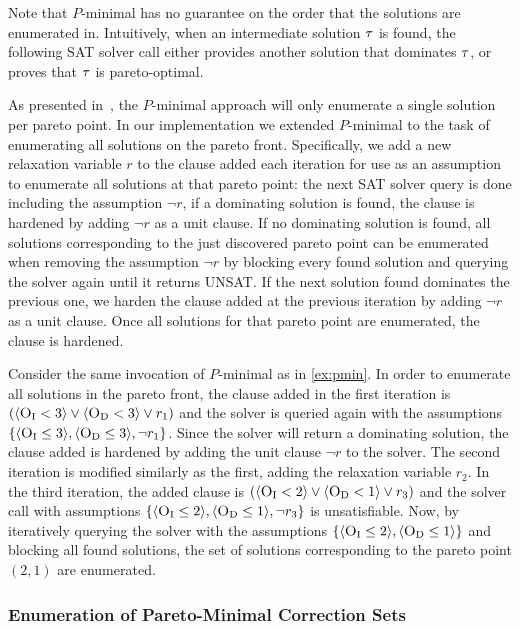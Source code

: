 Note that $P$-minimal has no guarantee on the order that the solutions are enumerated in. 
Intuitively, when an intermediate solution $\tau$ is found, the following SAT solver call either provides another solution that dominates $\tau$, or proves that $\tau$ is pareto-optimal.  

As presented in~\cite{DBLP:conf/cp/SohBTB17}, the $P$-minimal approach will only enumerate a single solution per pareto point.
In our implementation we extended $P$-minimal to the task of enumerating all solutions on the pareto front.
Specifically, we add a new relaxation variable $r$ to the clause added each iteration for use as an assumption to enumerate all solutions at that pareto point:
the next SAT solver query is done including the assumption $\lnot r$, if a dominating solution is found, the clause is hardened by adding $\lnot r$ as a unit clause.
If no dominating solution is found, all solutions corresponding to the just discovered pareto point can be enumerated when removing the assumption $\lnot r$ by blocking every found solution and querying the solver again until it returns UNSAT.
If the next solution found dominates the previous one, we harden the clause added at the previous iteration by adding $\lnot r$ as a unit clause.
Once all solutions for that pareto point are enumerated, the clause is hardened.

\begin{example}
  Consider the same invocation of $P$-minimal as in \cref{ex:pmin}.
  In order to enumerate all solutions in the pareto front, the clause added in the first iteration is $(\langle \textsc{O}_{\text{I}} < 3 \rangle \lor \langle \textsc{O}_{\text{D}} < 3 \rangle \lor r_1)$ and the solver is queried again with the assumptions $\{ \langle \textsc{O}_{\text{I}} \leq 3 \rangle, \langle \textsc{O}_{\text{D}} \leq 3 \rangle, \lnot r_1 \}$.
  Since the solver will return a dominating solution, the clause added is hardened by adding the unit clause $\lnot r$ to the solver.
  The second iteration is modified similarly as the first, adding the relaxation variable $r_2$.
  In the third iteration, the added clause is $(\langle \textsc{O}_{\text{I}} < 2 \rangle \lor \langle \textsc{O}_{\text{D}} < 1 \rangle \lor r_3)$ and the solver call with assumptions $\{ \langle \textsc{O}_{\text{I}} \leq 2 \rangle, \langle \textsc{O}_{\text{D}} \leq 1 \rangle, \lnot r_3 \}$ is unsatisfiable.
  Now, by iteratively querying the solver with the assumptions $\{ \langle \textsc{O}_{\text{I}} \leq 2 \rangle, \langle \textsc{O}_{\text{D}} \leq 1 \rangle \}$ and blocking all found solutions, the set of solutions corresponding to the pareto point $(2,1)$ are enumerated.
\end{example}

\subsubsection{Enumeration of Pareto-Minimal Correction Sets\label{sec:pareto-mcs}}


